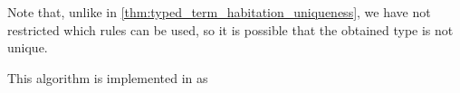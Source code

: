 \begin{comments}
  \item Note that, unlike in \cref{thm:typed_term_habitation_uniqueness}, we have not restricted which rules can be used, so it is possible that the obtained type is not unique.

  \item This algorithm is implemented in \cite{notebook:code} as
  \begin{CodeRefDisplay}
  \end{CodeRefDisplay}
\end{comments}
